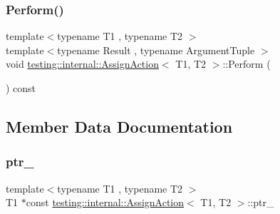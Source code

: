 \mbox{\label{classtesting_1_1internal_1_1_assign_action_a540912bec1f4de6fc4c7de26312e4586}} 
\subsubsection{\texorpdfstring{Perform()}{Perform()}\hspace{0.1cm}{\footnotesize\ttfamily [3/3]}}
{\footnotesize\ttfamily template$<$typename T1 , typename T2 $>$ \\
template$<$typename Result , typename Argument\+Tuple $>$ \\
void \mbox{\hyperlink{classtesting_1_1internal_1_1_assign_action}{testing\+::internal\+::\+Assign\+Action}}$<$ T1, T2 $>$\+::Perform (\begin{DoxyParamCaption}\item[{const Argument\+Tuple \&}]{ }\end{DoxyParamCaption}) const\hspace{0.3cm}{\ttfamily [inline]}}



\subsection{Member Data Documentation}
\mbox{\label{classtesting_1_1internal_1_1_assign_action_a0821776ad1361b83771e6cdb25693d36}} 
\subsubsection{\texorpdfstring{ptr\_}{ptr\_}}
{\footnotesize\ttfamily template$<$typename T1 , typename T2 $>$ \\
T1 $\ast$const \mbox{\hyperlink{classtesting_1_1internal_1_1_assign_action}{testing\+::internal\+::\+Assign\+Action}}$<$ T1, T2 $>$\+::ptr\+\_\+\hspace{0.3cm}{\ttfamily [private]}}

